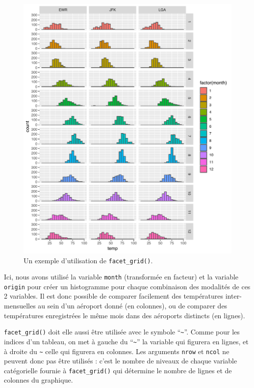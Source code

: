 \documentclass[
  a4paper,
]{article}
\begin{document}
\begin{figure}[htpb]

{\centering \includegraphics[width=0.9\linewidth]{figure/grid-1} 

}

\caption{Un exemple d'utilisation de \texttt{facet\_grid()}.}\label{fig:grid}
\end{figure}



Ici, nous avons utilisé la variable \texttt{month} (transformée en facteur) et la variable \texttt{origin} pour créer un histogramme pour chaque combinaison des modalités de ces 2 variables. Il est donc possible de comparer facilement des températures inter-mensuelles au sein d'un aéroport donné (en colonnes), ou de comparer des températures enregistrées le même mois dans des aéroports distincts (en lignes).

\texttt{facet\_grid()} doit elle aussi être utilisée avec le symbole ``\texttt{\textasciitilde{}}''. Comme pour les indices d'un tableau, on met à gauche du ``\texttt{\textasciitilde{}}'' la variable qui figurera en lignes, et à droite du \texttt{\textasciitilde{}} celle qui figurera en colonnes. Les arguments \texttt{nrow} et \texttt{ncol} ne peuvent donc pas être utilisés : c'est le nombre de niveaux de chaque variable catégorielle fournie à \texttt{facet\_grid()} qui détermine le nombre de lignes et de colonnes du graphique.
\end{document}
